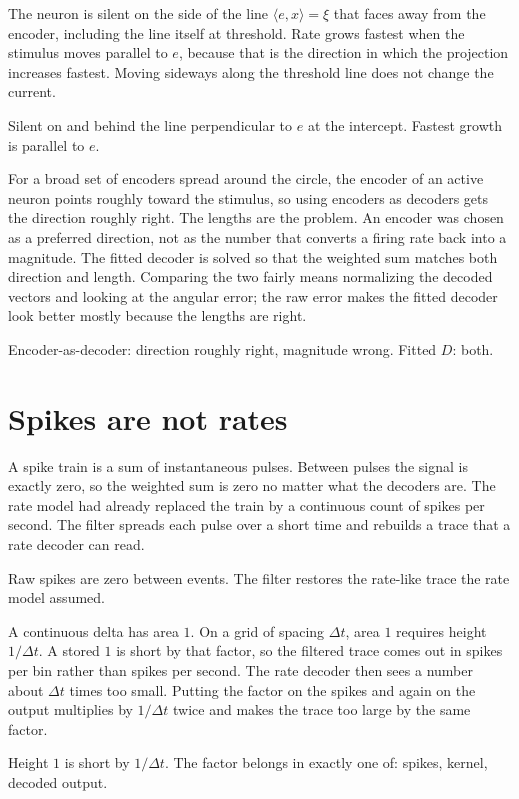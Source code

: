 \documentclass[11pt,letterpaper]{article}
\newcommand{\ans}[1]{\par\vspace{2pt}{\bfseries #1}\quad}
\begin{document}
\ans{1.}
The neuron is silent on the side of the line \(\langle e, x\rangle = \xi\) that faces away from the encoder, including the line itself at threshold. Rate grows fastest when the stimulus moves parallel to \(e\), because that is the direction in which the projection increases fastest. Moving sideways along the threshold line does not change the current.
\begin{result}
Silent on and behind the line perpendicular to \(e\) at the intercept. Fastest growth is parallel to \(e\).
\end{result}

\ans{2.}
For a broad set of encoders spread around the circle, the encoder of an active neuron points roughly toward the stimulus, so using encoders as decoders gets the direction roughly right. The lengths are the problem. An encoder was chosen as a preferred direction, not as the number that converts a firing rate back into a magnitude. The fitted decoder is solved so that the weighted sum matches both direction and length. Comparing the two fairly means normalizing the decoded vectors and looking at the angular error; the raw error makes the fitted decoder look better mostly because the lengths are right.
\begin{result}
Encoder-as-decoder: direction roughly right, magnitude wrong. Fitted \(D\): both.
\end{result}

\section{Spikes are not rates}

\ans{1.}
A spike train is a sum of instantaneous pulses. Between pulses the signal is exactly zero, so the weighted sum is zero no matter what the decoders are. The rate model had already replaced the train by a continuous count of spikes per second. The filter spreads each pulse over a short time and rebuilds a trace that a rate decoder can read.
\begin{result}
Raw spikes are zero between events. The filter restores the rate-like trace the rate model assumed.
\end{result}

\ans{2.}
A continuous delta has area \(1\). On a grid of spacing \(\Delta t\), area \(1\) requires height \(1/\Delta t\). A stored \(1\) is short by that factor, so the filtered trace comes out in spikes per bin rather than spikes per second. The rate decoder then sees a number about \(\Delta t\) times too small. Putting the factor on the spikes and again on the output multiplies by \(1/\Delta t\) twice and makes the trace too large by the same factor.
\begin{result}
Height \(1\) is short by \(1/\Delta t\). The factor belongs in exactly one of: spikes, kernel, decoded output.
\end{result}
\end{document}
